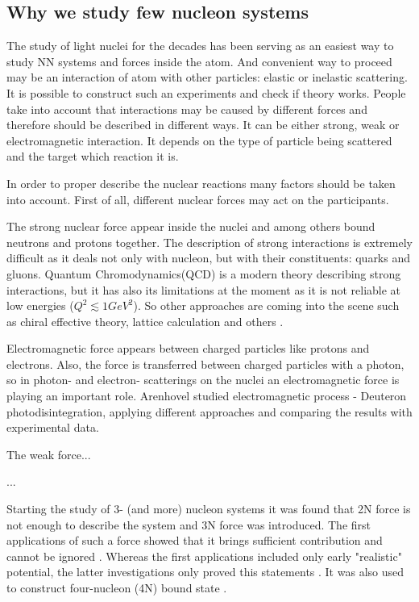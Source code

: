 \subsection*{Why we study few nucleon systems}

The study of light nuclei for the decades has been serving as an easiest way
to study NN systems and forces inside the atom. And
convenient way to proceed may be an interaction of atom with
other particles: elastic or inelastic scattering.
It is possible to construct such an experiments and check if theory works.
People take into account that interactions may be caused by different forces
and therefore should be described in different ways. It can be
either strong, weak or electromagnetic interaction. It depends
on the type of particle being scattered and the target which reaction it is.

In order to proper describe the nuclear reactions many
factors should be taken into account.
First of all, different nuclear forces may act on
the participants.


The strong nuclear force appear inside the nuclei and among others bound neutrons 
and protons together. The description of strong interactions is extremely
difficult as it deals not only with nucleon, but with their constituents: quarks
and gluons. Quantum Chromodynamics(QCD) is a modern theory
describing strong interactions, but it has also its limitations at the moment
as it is not reliable at low energies ($Q^2 \lesssim 1 GeV^2$).
So other approaches are coming into the scene such as 
chiral effective theory, lattice calculation and others \cite{IOFFE2006232}.

Electromagnetic force appears between charged particles like protons and electrons.
Also, the force is transferred between charged particles with a photon, so 
in photon- and electron- scatterings on the nuclei an electromagnetic
force is playing an important role. Arenhovel \cite{ArenhovelPhotodisint1991} 
studied electromagnetic process - Deuteron photodisintegration,
applying different approaches and comparing the results with
experimental data.

The weak force...

...  

Starting the study of 3- (and more) nucleon systems it was found that 2N force is not enough to describe
the system and 3N force was introduced. The first applications of such
a force showed that it brings sufficient contribution and cannot be ignored \cite{GLOCKLE1982343}.
Whereas the first applications included only early "realistic" potential, the latter
investigations only proved this statements \cite{StoksPhysRevC49, WIRINGAPhysRevC51}.
It was also used to construct four-nucleon (4N) bound state \cite{NoggaPhysRevLett}.

